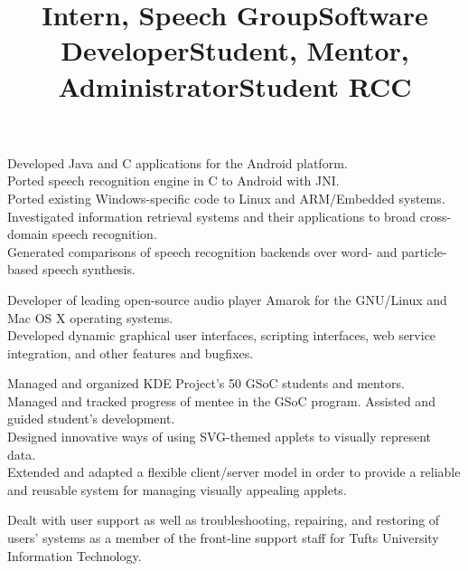 \documentclass[overlapped,line,letterpaper]{res}
\begin{document}
\begin{resume}
\title{Intern, Speech Group}
\begin{position}
\textbullet \space Developed Java and C applications for the Android platform. \\
\textbullet \space Ported speech recognition engine in C to Android with JNI. \\
\textbullet \space Ported existing Windows-specific code to Linux and ARM/Embedded systems. \\
\textbullet \space Investigated information retrieval systems and their applications to broad cross-domain speech recognition. \\
\textbullet \space Generated comparisons of speech recognition backends over word- and particle-based speech synthesis.
\end{position}

\title{Software Developer}
\begin{position}
\textbullet \space Developer of leading open-source audio player Amarok for the GNU/Linux and Mac OS X operating systems. \\
\textbullet \space Developed dynamic graphical user interfaces, scripting interfaces, web service integration, and other features and bugfixes.
\end{position}

\title{Student, Mentor, Administrator}
\begin{position}
\textbullet \space Managed and organized KDE Project's 50 GSoC students and mentors.\\
\textbullet \space Managed and tracked progress of mentee in the GSoC program. Assisted and guided student's development.\\
\textbullet \space Designed innovative ways of using SVG-themed applets to visually represent data. \\
\textbullet \space Extended and adapted a flexible client/server model in order to provide a reliable and reusable system for managing visually appealing applets.
\end{position}

\title{Student RCC}
\begin{position}
\textbullet \space Dealt with user support as well as troubleshooting, repairing, and restoring of users' systems as a member of the front-line support staff for Tufts University Information Technology.
\end{position}


\end{resume}
\end{document}
